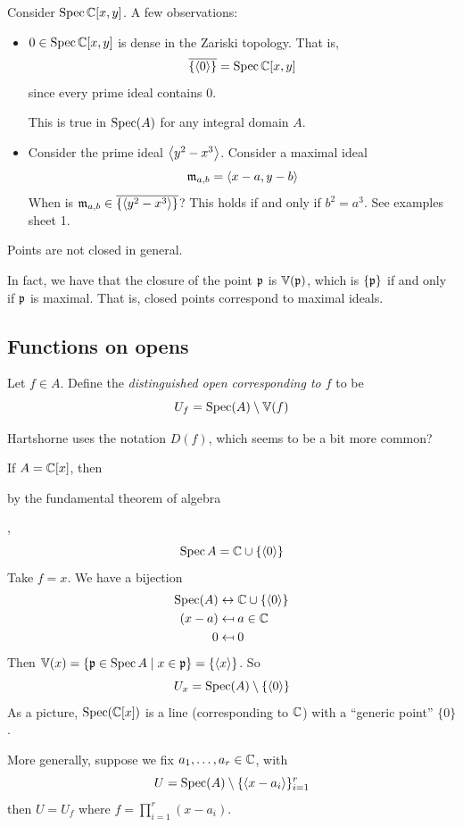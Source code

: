 \documentclass{article}
\begin{document}
\begin{example}
    Consider \(\operatorname{Spec}\mathbb{C}[x, y]\). A few observations:
    \begin{itemize}
        \item \(0 \in \operatorname{Spec}\mathbb{C}[x, y]\) is dense in the Zariski topology. That is,
        \[\overline{\{\left\langle 0 \right\rangle\}} = \operatorname{Spec}\mathbb{C}[x, y]\]
        since every prime ideal contains \(0\).
        \begin{addendum}
            This is true in \(\operatorname{Spec}(A)\) for any integral domain \(A\).
        \end{addendum}
        \item Consider the prime ideal \(\left\langle y^2 - x^3 \right\rangle\). Consider a maximal ideal
        \[\mathfrak{m}_{a, b} = \left\langle x-a, y-b \right\rangle\]
        When is \(\mathfrak{m}_{a, b} \in \overline{\{\left\langle y^2 - x^3 \right\rangle\}}\)? This holds if and only if \(b^2 = a^3\). See examples sheet 1.
    \end{itemize}
    \begin{remark}
        Points are not closed in general.
        \begin{addendum}
            In fact, we have that the closure of the point \(\mathfrak{p}\) is \(\mathbb{V}(\mathfrak{p})\), which is \(\{\mathfrak{p}\}\) if and only if \(\mathfrak{p}\) is maximal. That is, closed points correspond to maximal ideals.
        \end{addendum}
    \end{remark}
\end{example}

\subsection{Functions on opens}

Let \(f \in A\). Define the \emph{distinguished open corresponding to \(f\)} to be
\[U_f = \operatorname{Spec}(A) \setminus \mathbb{V}(f)\]
\begin{addendum}
    Hartshorne uses the notation \(D(f)\), which seems to be a bit more common?
\end{addendum}

\begin{example}
    If \(A = \mathbb{C}[x]\), then \begin{addendum}
        by the fundamental theorem of algebra
    \end{addendum},
    \[\operatorname{Spec} A = \mathbb{C} \cup \{\left\langle 0 \right\rangle\}\]
    Take \(f = x\). We have a bijection
    \begin{align*}
        \operatorname{Spec}(A) &\leftrightarrow \mathbb{C} \cup \{\left\langle 0 \right\rangle\} \\
        (x-a) &\mapsfrom a \in \mathbb{C} \\
        0 &\mapsfrom 0
    \end{align*}
    Then \(\mathbb{V}(x) = \{\mathfrak{p} \in \operatorname{Spec} A \mid x \in \mathfrak{p}\} = \{\left\langle x \right\rangle\}\). So
    \[U_x = \operatorname{Spec}(A) \setminus \{\left\langle 0 \right\rangle\}\]
    As a picture, \(\operatorname{Spec}(\mathbb{C}[x])\) is a line (corresponding to \(\mathbb{C}\)) with a ``generic point'' \(\{0\}\).

    More generally, suppose we fix \(a_1, \dots, a_r \in \mathbb{C}\), with
    \[U = \operatorname{Spec}(A) \setminus \{\left\langle x-a_i \right\rangle\}_{i=1}^r\]
    then
    \(U = U_f\)
    where \(f = \prod_{i=1}^r(x - a_i)\).
\end{example}
\end{document}
